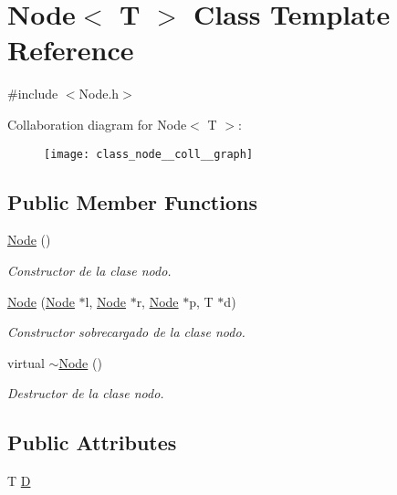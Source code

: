 \hypertarget{class_node}{\section{Node$<$ T $>$ Class Template Reference}
\label{class_node}
}


{\ttfamily \#include $<$Node.\+h$>$}



Collaboration diagram for Node$<$ T $>$\+:
\nopagebreak
\begin{figure}[H]
\begin{center}
\leavevmode
\texttt{[image: class\_node\_\_coll\_\_graph]}
\end{center}
\end{figure}
\subsection*{Public Member Functions}
\begin{DoxyCompactItemize}
\item 
\hyperlink{class_node_a0ac1d44cfe588be564acf25485029bd8}{Node} ()
\begin{DoxyCompactList}\small\item\em Constructor de la clase nodo. \end{DoxyCompactList}\item 
\hyperlink{class_node_a0e82c9207237470fb2438277b58f2465}{Node} (\hyperlink{class_node}{Node} $\ast$l, \hyperlink{class_node}{Node} $\ast$r, \hyperlink{class_node}{Node} $\ast$p, T $\ast$d)
\begin{DoxyCompactList}\small\item\em Constructor sobrecargado de la clase nodo. \end{DoxyCompactList}\item 
virtual \hyperlink{class_node_a9d7766f31d47a9a69927635600e34718}{$\sim$\+Node} ()
\begin{DoxyCompactList}\small\item\em Destructor de la clase nodo. \end{DoxyCompactList}\end{DoxyCompactItemize}
\subsection*{Public Attributes}
\begin{DoxyCompactItemize}
\item 
T \hyperlink{class_node_ade05a452f3fc4e823b9cdc940546e644}{D}
\end{DoxyCompactItemize}



